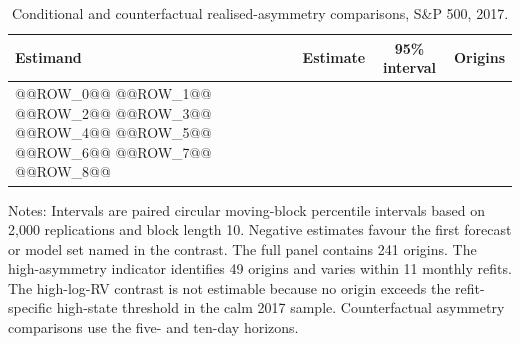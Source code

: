 \begin{table}[htbp]
\centering
\begin{threeparttable}
\caption{Conditional and counterfactual realised-asymmetry comparisons, S\&P 500, 2017.}
\label{tab:rv-ra-conditional}
\scriptsize
\setlength{\tabcolsep}{3pt}
\begin{tabular}{@{}lrrr@{}}
\toprule
Estimand & Estimate & \multicolumn{1}{c}{95\% interval} & Origins \\
\midrule
@@ROW_0@@
@@ROW_1@@
@@ROW_2@@
@@ROW_3@@
@@ROW_4@@
@@ROW_5@@
@@ROW_6@@
@@ROW_7@@
@@ROW_8@@
\bottomrule
\end{tabular}
\begin{tablenotes}[flushleft]
\footnotesize
\item Notes: Intervals are paired circular moving-block percentile intervals based on 2,000 replications and block length 10. Negative estimates favour the first forecast or model set named in the contrast. The full panel contains 241 origins. The high-asymmetry indicator identifies 49 origins and varies within 11 monthly refits. The high-log-RV contrast is not estimable because no origin exceeds the refit-specific high-state threshold in the calm 2017 sample. Counterfactual asymmetry comparisons use the five- and ten-day horizons.
\end{tablenotes}
\end{threeparttable}
\end{table}
